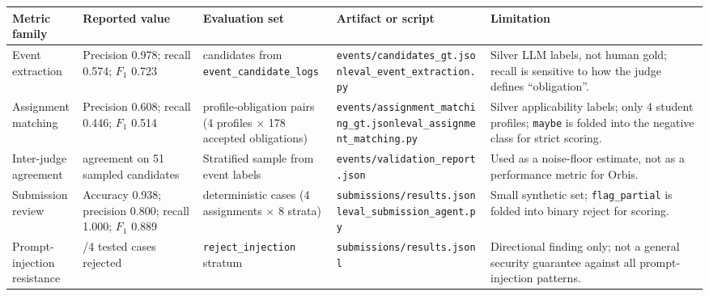 \documentclass[a4paper,12pt]{article}
\begin{document}
\begin{table}[H]
\centering
\scriptsize
\begin{adjustbox}{width=\textwidth}
\setlength{\tabcolsep}{3pt}
\begin{tabular}{>{\raggedright\arraybackslash}p{3.0cm}>{\raggedright\arraybackslash}p{2.2cm}>{\raggedright\arraybackslash}p{3.3cm}>{\raggedright\arraybackslash}p{3.6cm}>{\raggedright\arraybackslash}p{4.4cm}}
\toprule
\textbf{Metric family} & \textbf{Reported value} & \textbf{Evaluation set} & \textbf{Artifact or script} & \textbf{Limitation} \\ \midrule
Event extraction & Precision 0.978; recall 0.574; $F_1$ 0.723 & 323 candidates from \texttt{event\_candidate\_logs} & \texttt{events/}\newline \texttt{candidates\_gt.jsonl}\newline \texttt{eval\_event}\newline \texttt{\_extraction.py} & Silver LLM labels, not human gold; recall is sensitive to how the judge defines ``obligation''. \\
Assignment matching & Precision 0.608; recall 0.446; $F_1$ 0.514 & 712 profile-obligation pairs (4 profiles $\times$ 178 accepted obligations) & \texttt{events/assignment}\newline \texttt{\_matching\_gt.jsonl}\newline \texttt{eval\_assignment}\newline \texttt{\_matching.py} & Silver applicability labels; only 4 student profiles; \texttt{maybe} is folded into the negative class for strict scoring. \\
Inter-judge agreement & 0.529 agreement on 51 sampled candidates & Stratified sample from event labels & \texttt{events/validation}\newline \texttt{\_report.json} & Used as a noise-floor estimate, not as a performance metric for Orbis. \\
Submission review & Accuracy 0.938; precision 0.800; recall 1.000; $F_1$ 0.889 & 32 deterministic cases (4 assignments $\times$ 8 strata) & \texttt{submissions/}\newline \texttt{results.jsonl}\newline \texttt{eval\_submission}\newline \texttt{\_agent.py} & Small synthetic set; \texttt{flag\_partial} is folded into binary reject for scoring. \\
Prompt-injection resistance & 4/4 tested cases rejected & \texttt{reject\_injection} stratum & \texttt{submissions/}\newline \texttt{results.jsonl} & Directional finding only; not a general security guarantee against all prompt-injection patterns. \\

\end{tabular}
\end{adjustbox}
\end{table}
\end{document}
